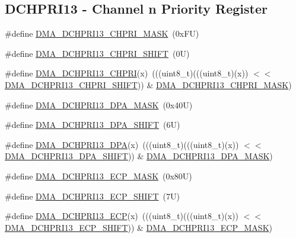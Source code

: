\subsection*{D\+C\+H\+P\+R\+I13 -\/ Channel n Priority Register}
\begin{DoxyCompactItemize}
\item 
\#define \mbox{\hyperlink{group___d_m_a___register___masks_gad9e91383771ebbcea15c43585eada037}{D\+M\+A\+\_\+\+D\+C\+H\+P\+R\+I13\+\_\+\+C\+H\+P\+R\+I\+\_\+\+M\+A\+SK}}~(0x\+F\+U)
\item 
\#define \mbox{\hyperlink{group___d_m_a___register___masks_ga71e8be2fe53b3e57287a73d382467140}{D\+M\+A\+\_\+\+D\+C\+H\+P\+R\+I13\+\_\+\+C\+H\+P\+R\+I\+\_\+\+S\+H\+I\+FT}}~(0\+U)
\item 
\#define \mbox{\hyperlink{group___d_m_a___register___masks_gab1db4316293e7eda20fa296e51681172}{D\+M\+A\+\_\+\+D\+C\+H\+P\+R\+I13\+\_\+\+C\+H\+P\+RI}}(x)~(((uint8\+\_\+t)(((uint8\+\_\+t)(x)) $<$$<$ \mbox{\hyperlink{group___d_m_a___register___masks_ga71e8be2fe53b3e57287a73d382467140}{D\+M\+A\+\_\+\+D\+C\+H\+P\+R\+I13\+\_\+\+C\+H\+P\+R\+I\+\_\+\+S\+H\+I\+FT}})) \& \mbox{\hyperlink{group___d_m_a___register___masks_gad9e91383771ebbcea15c43585eada037}{D\+M\+A\+\_\+\+D\+C\+H\+P\+R\+I13\+\_\+\+C\+H\+P\+R\+I\+\_\+\+M\+A\+SK}})
\item 
\#define \mbox{\hyperlink{group___d_m_a___register___masks_ga7d0dba9a621669e28a8c6c557d962502}{D\+M\+A\+\_\+\+D\+C\+H\+P\+R\+I13\+\_\+\+D\+P\+A\+\_\+\+M\+A\+SK}}~(0x40\+U)
\item 
\#define \mbox{\hyperlink{group___d_m_a___register___masks_ga94fae69ff7774aa7d1f24fd8b2387a40}{D\+M\+A\+\_\+\+D\+C\+H\+P\+R\+I13\+\_\+\+D\+P\+A\+\_\+\+S\+H\+I\+FT}}~(6\+U)
\item 
\#define \mbox{\hyperlink{group___d_m_a___register___masks_ga1937b0b5f4d5d608d18604bbe1386f7d}{D\+M\+A\+\_\+\+D\+C\+H\+P\+R\+I13\+\_\+\+D\+PA}}(x)~(((uint8\+\_\+t)(((uint8\+\_\+t)(x)) $<$$<$ \mbox{\hyperlink{group___d_m_a___register___masks_ga94fae69ff7774aa7d1f24fd8b2387a40}{D\+M\+A\+\_\+\+D\+C\+H\+P\+R\+I13\+\_\+\+D\+P\+A\+\_\+\+S\+H\+I\+FT}})) \& \mbox{\hyperlink{group___d_m_a___register___masks_ga7d0dba9a621669e28a8c6c557d962502}{D\+M\+A\+\_\+\+D\+C\+H\+P\+R\+I13\+\_\+\+D\+P\+A\+\_\+\+M\+A\+SK}})
\item 
\#define \mbox{\hyperlink{group___d_m_a___register___masks_ga74ad97c0ca8dfdd5152b2db375389908}{D\+M\+A\+\_\+\+D\+C\+H\+P\+R\+I13\+\_\+\+E\+C\+P\+\_\+\+M\+A\+SK}}~(0x80\+U)
\item 
\#define \mbox{\hyperlink{group___d_m_a___register___masks_ga462e7c666fbe9d355893654f7fe52cd9}{D\+M\+A\+\_\+\+D\+C\+H\+P\+R\+I13\+\_\+\+E\+C\+P\+\_\+\+S\+H\+I\+FT}}~(7\+U)
\item 
\#define \mbox{\hyperlink{group___d_m_a___register___masks_gae9fbec1b8987dd4a22e3466008ab5eb7}{D\+M\+A\+\_\+\+D\+C\+H\+P\+R\+I13\+\_\+\+E\+CP}}(x)~(((uint8\+\_\+t)(((uint8\+\_\+t)(x)) $<$$<$ \mbox{\hyperlink{group___d_m_a___register___masks_ga462e7c666fbe9d355893654f7fe52cd9}{D\+M\+A\+\_\+\+D\+C\+H\+P\+R\+I13\+\_\+\+E\+C\+P\+\_\+\+S\+H\+I\+FT}})) \& \mbox{\hyperlink{group___d_m_a___register___masks_ga74ad97c0ca8dfdd5152b2db375389908}{D\+M\+A\+\_\+\+D\+C\+H\+P\+R\+I13\+\_\+\+E\+C\+P\+\_\+\+M\+A\+SK}})
\end{DoxyCompactItemize}
